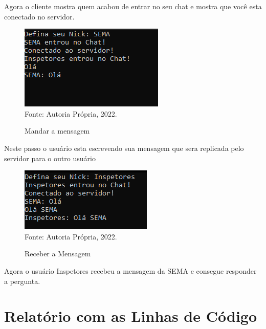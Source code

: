 \par Agora o cliente mostra quem acabou de entrar no seu chat e mostra que você esta conectado no servidor.
\newpage\thispagestyle{empty}
\begin{figure}[htbp]
	\centering
	\caption{Mandar a mensagem}
	\includegraphics[]{Printis/ClientMandarMSg.png}
	{\\Fonte: Autoria Própria, 2022.}
	\label{fig:criação_1}
\end{figure}

\par Neste passo o usuário esta escrevendo sua mensagem que sera replicada pelo servidor para o outro usuário

\begin{figure}[htbp]
	\centering
	\caption{Receber a Mensagem}
	\includegraphics[]{Printis/OlaSema.png}
	{\\Fonte: Autoria Própria, 2022.}
	\label{fig:criação_1}
\end{figure}

\par Agora o usuário Inspetores recebeu a mensagem da SEMA e consegue responder a pergunta.
\newpage\thispagestyle{empty}
\chapter{\textbf{Relatório com as Linhas de Código}}
\renewcommand\lstlistingname{\textbf{Arquivo}}



\newpage\thispagestyle{empty}

\newpage\thispagestyle{empty}



